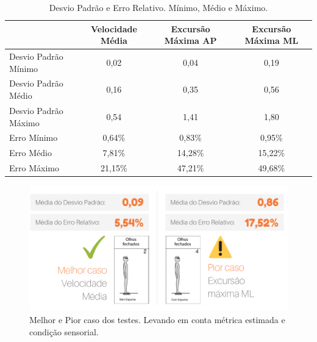 \begin{table}[]
 \captionsetup{justification   = raggedright,
              singlelinecheck = false}
 \caption{Desvio Padrão e Erro Relativo. Mínimo, Médio e Máximo.} \label{tabelaMinMeanMax}
\begin{tabular}{@{}lccc@{}}
\toprule
                     & \textbf{Velocidade Média} & \textbf{Excursão Máxima AP} & \textbf{Excursão Máxima ML} \\ \midrule
Desvio Padrão Mínimo & 0,02                      & 0,04                        & 0,19                        \\
Desvio Padrão Médio  & 0,16                      & 0,35                        & 0,56                        \\
Desvio Padrão Máximo & 0,54                      & 1,41                        & 1,80                        \\ \midrule
Erro Mínimo          & 0,64\%                    & 0,83\%                      & 0,95\%                      \\
Erro Médio           & 7,81\%                    & 14,28\%                     & 15,22\%                     \\
Erro Máximo          & 21,15\%                   & 47,21\%                     & 49,68\%                \\  \midrule  
\end{tabular}
\end{table}

\begin{figure}[ht]
\captionsetup{justification   = raggedright,
              singlelinecheck = false}
\caption{Melhor e Pior caso dos testes. Levando em conta métrica estimada e condição sensorial.}\label{piorMelhor}
\includegraphics[width=1.0\textwidth]{result.png}
\end{figure}

